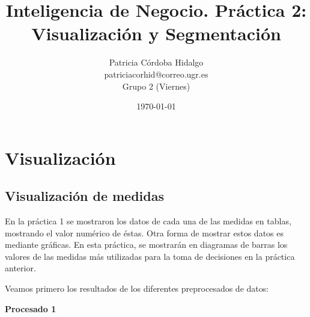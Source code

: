 \documentclass[a4]{article}
\title{\Huge Inteligencia de Negocio. Práctica 2:\\
Visualización y Segmentación \vspace{5mm}}
\author{\LARGE Patricia Córdoba Hidalgo \vspace{2mm}\\
  \Large patriciacorhid@correo.ugr.es \vspace{2mm}\\
  \Large Grupo 2 (Viernes) \vspace{5mm}}
\date{\today}
\begin{document}
\maketitle

\newpage
\tableofcontents
\newpage

\section{Visualización}

\subsection{Visualización de medidas}

En la práctica 1 se mostraron los datos de cada una de las medidas en tablas, mostrando el valor numérico de éstas. Otra forma de mostrar estos datos es mediante gráficas. En esta práctica, se mostrarán en diagramas de barras los valores de las medidas más utilizadas para la toma de decisiones en la práctica anterior.

Veamos primero los resultados de los diferentes preprocesados de datos:

\begin{center}
  \textbf{Procesado 1}
\end{center}

\begin{figure}[H]
  \centering
\end{figure}
\end{document}
